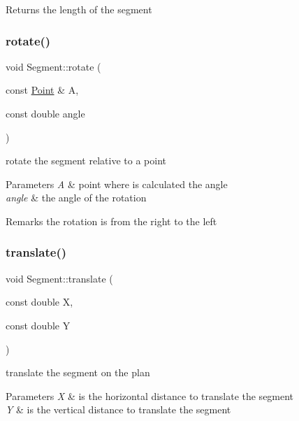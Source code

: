 \begin{DoxyReturn}{Returns}
the length of the segment 
\end{DoxyReturn}
\hypertarget{class_segment_ab6249f23914eaa6ab4864c46202039bd}{}\label{class_segment_ab6249f23914eaa6ab4864c46202039bd} 
\subsubsection{\texorpdfstring{rotate()}{rotate()}}
{\footnotesize\ttfamily void Segment\+::rotate (\begin{DoxyParamCaption}\item[{const \hyperlink{class_point}{Point} \&}]{A,  }\item[{const double}]{angle }\end{DoxyParamCaption})}



rotate the segment relative to a point 


\begin{DoxyParams}{Parameters}
{\em A} & point where is calculated the angle \\
\hline
{\em angle} & the angle of the rotation \\
\hline
\end{DoxyParams}
\begin{DoxyRemark}{Remarks}
the rotation is from the right to the left 
\end{DoxyRemark}
\hypertarget{class_segment_a265c7d9b2b36e633c8329a576ecf83cb}{}\label{class_segment_a265c7d9b2b36e633c8329a576ecf83cb} 
\subsubsection{\texorpdfstring{translate()}{translate()}}
{\footnotesize\ttfamily void Segment\+::translate (\begin{DoxyParamCaption}\item[{const double}]{X,  }\item[{const double}]{Y }\end{DoxyParamCaption})}



translate the segment on the plan 


\begin{DoxyParams}{Parameters}
{\em X} & is the horizontal distance to translate the segment \\
\hline
{\em Y} & is the vertical distance to translate the segment \\
\hline
\end{DoxyParams}


